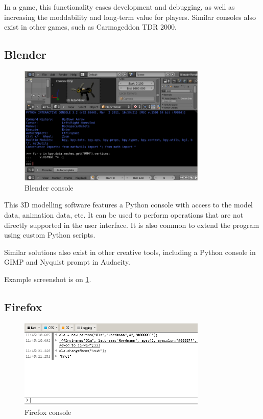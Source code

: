 In a game, this functionality eases development and debugging, as well as increasing the moddability and long-term value for players. Similar consoles also exist in other games, such as Carmageddon TDR 2000.

\subsection{Blender}

\begin{figure}
\centering
\includegraphics[width = 0.8\textwidth]{image/blender.png}
\caption{Blender console}
\label{image-blender}
\end{figure}

This 3D modelling software features a Python console with access to the model data, animation data, etc. It can be used to perform operations that are not directly supported in the user interface. It is also common to extend the program using custom Python scripts. 

Similar solutions also exist in other creative tools, including a Python console in GIMP and Nyquist prompt in Audacity.

Example screenshot is on \ref{image-blender}.

\subsection{Firefox}

\begin{figure}
\centering
\includegraphics[width = 0.8\textwidth]{image/firefox.png}
\caption{Firefox console}
\label{image-firefox}
\end{figure}

